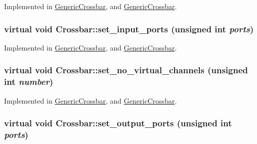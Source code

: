 Implemented in \hyperlink{classGenericCrossbar_1949b9db3b5b1950ad6a2c9e46103024}{GenericCrossbar}, and \hyperlink{classGenericCrossbar_1949b9db3b5b1950ad6a2c9e46103024}{GenericCrossbar}.\hypertarget{classCrossbar_3223fa48d2c281d62747e4c10a14e1ba}{
\subsubsection[{set\_\-input\_\-ports}]{\setlength{\rightskip}{0pt plus 5cm}virtual void Crossbar::set\_\-input\_\-ports (unsigned int {\em ports})}}
\label{classCrossbar_3223fa48d2c281d62747e4c10a14e1ba}




Implemented in \hyperlink{classGenericCrossbar_c97249405a9bc78f2c1c9c28ad660472}{GenericCrossbar}, and \hyperlink{classGenericCrossbar_c97249405a9bc78f2c1c9c28ad660472}{GenericCrossbar}.\hypertarget{classCrossbar_e7da6eea8ab565f26513dfe52d1516f5}{
\subsubsection[{set\_\-no\_\-virtual\_\-channels}]{\setlength{\rightskip}{0pt plus 5cm}virtual void Crossbar::set\_\-no\_\-virtual\_\-channels (unsigned int {\em number})}}
\label{classCrossbar_e7da6eea8ab565f26513dfe52d1516f5}




Implemented in \hyperlink{classGenericCrossbar_e9d67e36be87ea3169baa80ae52044e3}{GenericCrossbar}, and \hyperlink{classGenericCrossbar_e9d67e36be87ea3169baa80ae52044e3}{GenericCrossbar}.\hypertarget{classCrossbar_291346aae5dfeee7ef946ee3addc3877}{
\subsubsection[{set\_\-output\_\-ports}]{\setlength{\rightskip}{0pt plus 5cm}virtual void Crossbar::set\_\-output\_\-ports (unsigned int {\em ports})}}
\label{classCrossbar_291346aae5dfeee7ef946ee3addc3877}




